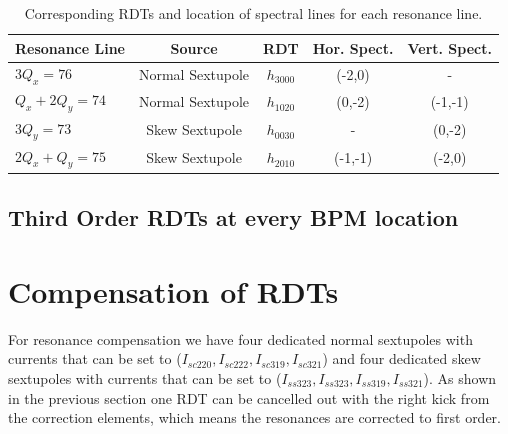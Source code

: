 \begin{table}[H]
    \centering
    \caption{Corresponding RDTs and location of spectral lines for each resonance line.}
    \begin{tabular}{lcccc}
        \toprule
        \textbf{Resonance Line} & \textbf{Source} & \textbf{RDT} & \textbf{Hor. Spect.} & \textbf{Vert. Spect.} \\
        \midrule
            $3Q_x=76$     & Normal Sextupole    & $h_{3000}$           &  (-2,0)  & -       \\ %
           $Q_x+2Q_y=74$   & Normal Sextupole    & $h_{1020}$            & (0,-2) & (-1,-1)       \\ %
            $3Q_y=73$     & Skew Sextupole   & $h_{0030}$           & - & (0,-2)        \\ %
            $2Q_x+Q_y=75$   & Skew Sextupole    & $h_{2010}$     & (-1,-1) & (-2,0)       \\
        \bottomrule
    \end{tabular}
    \label{tab:rdtlines}
\end{table}

\subsection{Third Order RDTs at every BPM location}

\section{Compensation of RDTs}

For resonance compensation we have four dedicated normal sextupoles with currents that can be set to ($I_{sc220},I_{sc222},I_{sc319},I_{sc321}$) and four dedicated skew sextupoles with currents that can be set to ($I_{ss323},I_{ss323},I_{ss319},I_{ss321}$). As shown in the previous section one RDT can be cancelled out with the right kick from the correction elements, which means the resonances are corrected to first order. 


